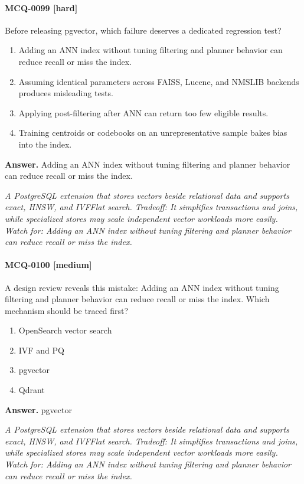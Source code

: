 \paragraph{MCQ-0099 [hard]} Before releasing pgvector, which failure deserves a dedicated regression test?
\begin{enumerate}[label=\Alph*.]
\item Adding an ANN index without tuning filtering and planner behavior can reduce recall or miss the index.
\item Assuming identical parameters across FAISS, Lucene, and NMSLIB backends produces misleading tests.
\item Applying post-filtering after ANN can return too few eligible results.
\item Training centroids or codebooks on an unrepresentative sample bakes bias into the index.
\end{enumerate}
\noindent\textbf{Answer.} Adding an ANN index without tuning filtering and planner behavior can reduce recall or miss the index.
\par\textit{A PostgreSQL extension that stores vectors beside relational data and supports exact, HNSW, and IVFFlat search. Tradeoff: It simplifies transactions and joins, while specialized stores may scale independent vector workloads more easily. Watch for: Adding an ANN index without tuning filtering and planner behavior can reduce recall or miss the index.}
\paragraph{MCQ-0100 [medium]} A design review reveals this mistake: Adding an ANN index without tuning filtering and planner behavior can reduce recall or miss the index. Which mechanism should be traced first?
\begin{enumerate}[label=\Alph*.]
\item OpenSearch vector search
\item IVF and PQ
\item pgvector
\item Qdrant
\end{enumerate}
\noindent\textbf{Answer.} pgvector
\par\textit{A PostgreSQL extension that stores vectors beside relational data and supports exact, HNSW, and IVFFlat search. Tradeoff: It simplifies transactions and joins, while specialized stores may scale independent vector workloads more easily. Watch for: Adding an ANN index without tuning filtering and planner behavior can reduce recall or miss the index.}

